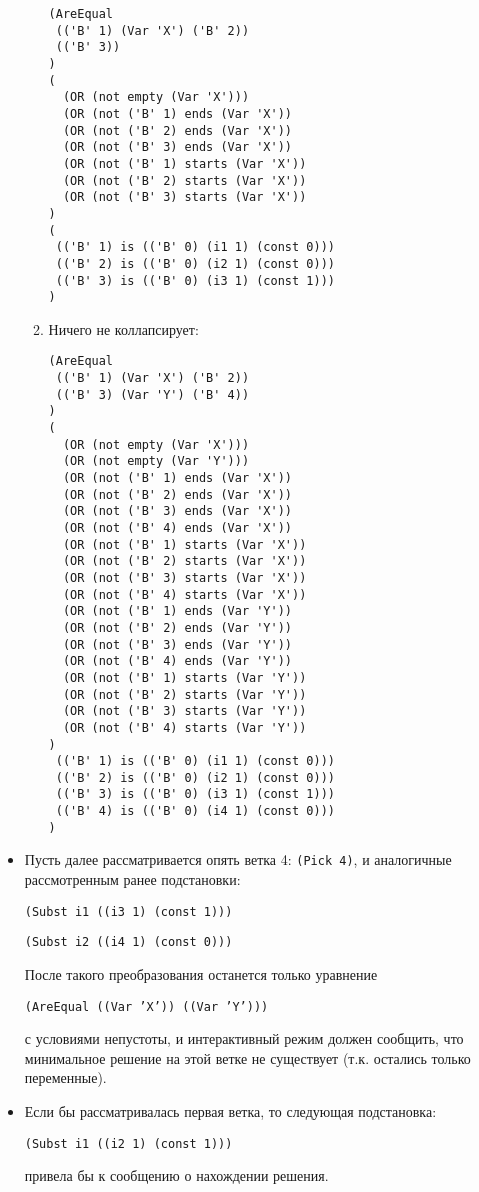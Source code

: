 \documentclass[12pt]{article}
\begin{document}
\begin{itemize}
\begin{enumerate}
\begin{verbatim}
(AreEqual 
 (('B' 1) (Var 'X') ('B' 2)) 
 (('B' 3))
)
(
  (OR (not empty (Var 'X')))
  (OR (not ('B' 1) ends (Var 'X'))
  (OR (not ('B' 2) ends (Var 'X'))
  (OR (not ('B' 3) ends (Var 'X'))
  (OR (not ('B' 1) starts (Var 'X'))
  (OR (not ('B' 2) starts (Var 'X'))
  (OR (not ('B' 3) starts (Var 'X'))
)
( 
 (('B' 1) is (('B' 0) (i1 1) (const 0))) 
 (('B' 2) is (('B' 0) (i2 1) (const 0))) 
 (('B' 3) is (('B' 0) (i3 1) (const 1))) 
)
\end{verbatim}
\item Ничего не коллапсирует:
\begin{verbatim}
(AreEqual 
 (('B' 1) (Var 'X') ('B' 2)) 
 (('B' 3) (Var 'Y') ('B' 4))
)
(
  (OR (not empty (Var 'X')))
  (OR (not empty (Var 'Y')))
  (OR (not ('B' 1) ends (Var 'X'))
  (OR (not ('B' 2) ends (Var 'X'))
  (OR (not ('B' 3) ends (Var 'X'))
  (OR (not ('B' 4) ends (Var 'X'))
  (OR (not ('B' 1) starts (Var 'X'))
  (OR (not ('B' 2) starts (Var 'X'))
  (OR (not ('B' 3) starts (Var 'X'))
  (OR (not ('B' 4) starts (Var 'X'))
  (OR (not ('B' 1) ends (Var 'Y'))
  (OR (not ('B' 2) ends (Var 'Y'))
  (OR (not ('B' 3) ends (Var 'Y'))
  (OR (not ('B' 4) ends (Var 'Y'))
  (OR (not ('B' 1) starts (Var 'Y'))
  (OR (not ('B' 2) starts (Var 'Y'))
  (OR (not ('B' 3) starts (Var 'Y'))
  (OR (not ('B' 4) starts (Var 'Y'))
)
 (('B' 1) is (('B' 0) (i1 1) (const 0))) 
 (('B' 2) is (('B' 0) (i2 1) (const 0))) 
 (('B' 3) is (('B' 0) (i3 1) (const 1))) 
 (('B' 4) is (('B' 0) (i4 1) (const 0))) 
)
\end{verbatim}

\end{enumerate}
\item Пусть далее рассматривается опять ветка 4: \texttt{(Pick 4)}, и аналогичные рассмотренным ранее подстановки:

\texttt{(Subst i1 ((i3 1) (const 1)))}

\texttt{(Subst i2 ((i4 1) (const 0)))}

После такого преобразования останется только уравнение 

\texttt{(AreEqual ((Var 'X')) ((Var 'Y')))} 

с условиями непустоты, и интерактивный режим должен сообщить, что минимальное решение на этой ветке не существует (т.к. остались только переменные).

\item Если бы рассматривалась первая ветка, то следующая подстановка:

\texttt{(Subst i1 ((i2 1) (const 1)))}

привела бы к сообщению о нахождении решения.
\end{itemize}
\end{document}
